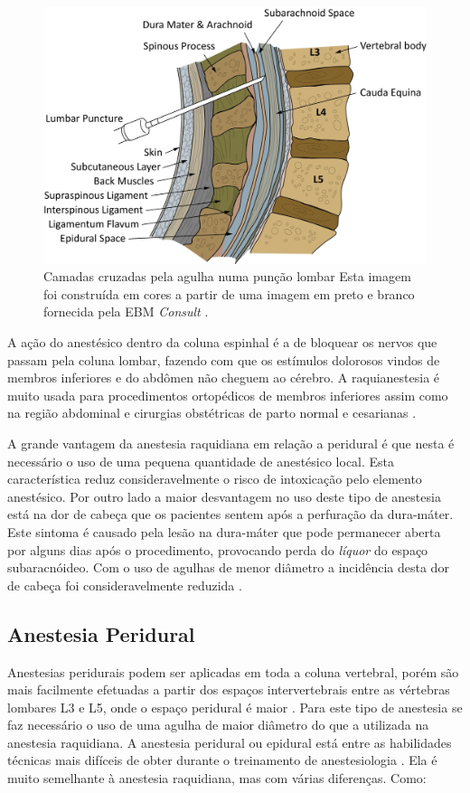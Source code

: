 \begin{figure}[ht!]
    \centering
    \includegraphics[width=0.6\linewidth]{capitulos/figuras/lumbar.puncture.tisssues.jpeg}
    \caption{Camadas cruzadas pela agulha numa punção lombar Esta imagem foi construída em cores a partir de uma imagem em preto e branco fornecida pela EBM \textit{Consult} \cite{Busti2015}.}
    \label{fig:camadasPuncaoLombar}
\end{figure}

A ação do anestésico dentro da coluna espinhal é a de bloquear os nervos que passam pela coluna lombar, fazendo com que os estímulos dolorosos vindos de membros inferiores e do abdômen não cheguem ao cérebro. A raquianestesia é muito usada para procedimentos ortopédicos de membros inferiores assim como na região abdominal e cirurgias obstétricas de parto normal e cesarianas \cite{Pinheiro2018}.

A grande vantagem da anestesia raquidiana em relação a peridural é que nesta é necessário o uso de uma pequena quantidade de anestésico local. Esta característica reduz consideravelmente o risco de intoxicação pelo elemento anestésico. Por outro lado a maior desvantagem no uso deste tipo de anestesia está na dor de cabeça que os pacientes sentem após a perfuração da dura-máter. Este sintoma é causado pela lesão na dura-máter que pode permanecer aberta por alguns dias após o procedimento, provocando perda do \textit{líquor} do espaço subaracnóideo. Com o uso de agulhas de menor diâmetro a incidência desta dor de cabeça foi consideravelmente reduzida \cite{INFOESCOLA2018}. 

\subsection{Anestesia Peridural} 
\label{sec:anestesiaPeridural}

Anestesias peridurais podem ser aplicadas em toda a coluna vertebral, porém são mais facilmente efetuadas a partir dos espaços intervertebrais entre as vértebras lombares L3 e L5, onde o espaço peridural é maior \cite{Raj1988}. Para este tipo de anestesia se faz necessário o uso de uma agulha de maior diâmetro do que a utilizada na anestesia raquidiana. A anestesia peridural ou epidural está entre as habilidades técnicas mais difíceis de obter durante o treinamento de anestesiologia \cite{Konrad1998}. Ela é muito semelhante à anestesia raquidiana, mas com várias diferenças. Como:

